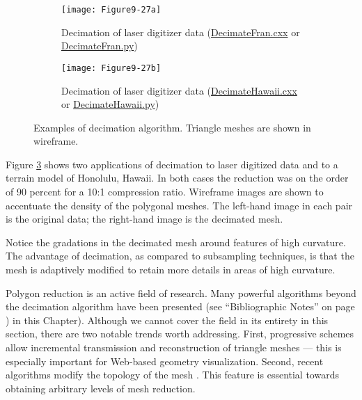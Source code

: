 \begin{description}[leftmargin=0cm,labelindent=0cm]
\begin{figure}[htb]
    \centering
	\begin{subfigure}[h]{0.96\linewidth}
		\texttt{[image: Figure9-27a]}
		\captionsetup{justification=centering}
		\caption{Decimation of laser digitizer data (\href{https://lorensen.github.io/VTKExamples/site/Cxx/VisualizationAlgorithms/DecimateFran/}{DecimateFran.cxx} or \href{https://lorensen.github.io/VTKExamples/site/Python/VisualizationAlgorithms/DecimateFran/}{DecimateFran.py})}
		\label{fig:Figure9-27a}
	\end{subfigure}
	\hfill
	\begin{subfigure}[h]{0.96\linewidth}
		\texttt{[image: Figure9-27b]}
		\captionsetup{justification=centering}
		\caption{Decimation of laser digitizer data (\href{https://lorensen.github.io/VTKExamples/site/Cxx/VisualizationAlgorithms/DecimateHawaii/}{DecimateHawaii.cxx} or \href{https://lorensen.github.io/VTKExamples/site/Python/VisualizationAlgorithms/DecimateHawaii/}{DecimateHawaii.py})}
		\label{fig:Figure9-27b}
	\end{subfigure}
	\caption{Examples of decimation algorithm. Triangle meshes are shown in wireframe.}\label{fig:Figure9-27}
\end{figure}

Figure \ref{fig:Figure9-27} shows two applications of decimation to laser digitized data and to a terrain model of Honolulu, Hawaii. In both cases the reduction was on the order of 90 percent for a 10:1 compression ratio. Wireframe images are shown to accentuate the density of the polygonal meshes. The left-hand image in each pair is the original data; the right-hand image is the decimated mesh.

Notice the gradations in the decimated mesh around features of high curvature. The advantage of decimation, as compared to subsampling techniques, is that the mesh is adaptively modified to retain more details in areas of high curvature.

\item[Advanced Techniques.] Polygon reduction is an active field of research. Many powerful algorithms beyond the decimation algorithm have been presented (see ``Bibliographic Notes'' on page  \pageref{sec:bibliographic_notes.ch09}) in this Chapter). Although we cannot cover the field in its entirety in this section, there are two notable trends worth addressing. First, progressive schemes \cite{Hoppe96} allow incremental transmission and reconstruction of triangle meshes --- this is especially important for Web-based geometry visualization. Second, recent algorithms modify the topology of the mesh \cite{He96} \cite{Popovic97} \cite{Schroeder97}. This feature is essential towards obtaining arbitrary levels of mesh reduction.


\end{description}
